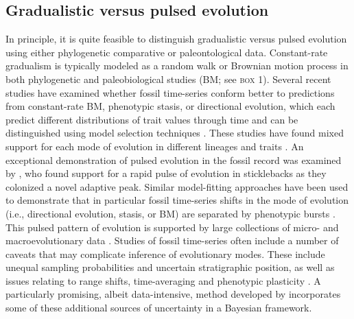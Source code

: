 \subsection{Gradualistic versus pulsed evolution}

In principle, it is quite feasible to distinguish gradualistic versus pulsed evolution using either phylogenetic comparative or paleontological data. Constant-rate gradualism is typically modeled as a random walk or Brownian motion process in both phylogenetic and paleobiological studies (BM; see \textsc{box 1}). Several recent studies have examined whether fossil time-series conform better to predictions from constant-rate BM, phenotypic stasis, or directional evolution, which each predict different distributions of trait values through time and can be distinguished using model selection techniques \citep{Hunt2012}. These studies have found mixed support for each mode of evolution in different lineages and traits \citep{Hunt2007, Huntetal2008, Hunt2008, Grey2008, Hopkins2012, Hunt2012}. An exceptional demonstration of pulsed evolution in the fossil record was examined by \citet{Huntetal2008}, who found support for a rapid pulse of evolution in sticklebacks as they colonized a novel adaptive peak. Similar model-fitting approaches have been used to demonstrate that in particular fossil time-series shifts in the mode of evolution (i.e., directional evolution, stasis, or BM) are separated by phenotypic bursts \citep{Hunt2008}. This pulsed pattern of evolution is supported by large collections of micro- and macroevolutionary data \citep{EstesArnold2007, Uyeda2011}. Studies of fossil time-series often include a number of caveats that may complicate inference of evolutionary modes. These include unequal sampling probabilities and uncertain stratigraphic position, as well as issues relating to range shifts, time-averaging and phenotypic plasticity \citep{StratPaleobook}. A particularly promising, albeit data-intensive, method developed by \citet{Hannisdal2007} incorporates some of these additional sources of uncertainty in a Bayesian framework.

